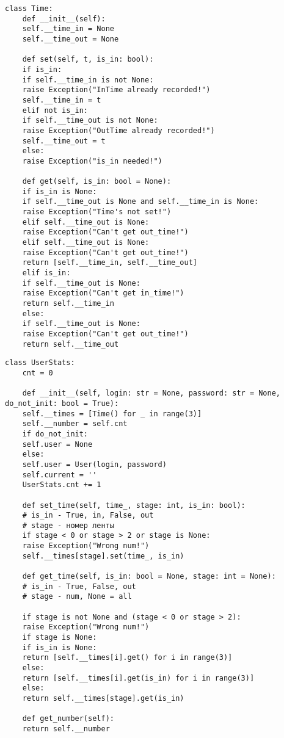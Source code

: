 \documentclass[../report.tex]{subfiles}
\begin{document}
\newpage
\begin{lstlisting}[caption=Класс Time]
	class Time:
	def __init__(self):
	self.__time_in = None
	self.__time_out = None
	
	def set(self, t, is_in: bool):
	if is_in:
	if self.__time_in is not None:
	raise Exception("InTime already recorded!")
	self.__time_in = t
	elif not is_in:
	if self.__time_out is not None:
	raise Exception("OutTime already recorded!")
	self.__time_out = t
	else:
	raise Exception("is_in needed!")
	
	def get(self, is_in: bool = None):
	if is_in is None:
	if self.__time_out is None and self.__time_in is None:
	raise Exception("Time's not set!")
	elif self.__time_out is None:
	raise Exception("Can't get out_time!")
	elif self.__time_out is None:
	raise Exception("Can't get out_time!")
	return [self.__time_in, self.__time_out]
	elif is_in:
	if self.__time_out is None:
	raise Exception("Can't get in_time!")
	return self.__time_in
	else:
	if self.__time_out is None:
	raise Exception("Can't get out_time!")
	return self.__time_out
\end{lstlisting}

\newpage
\begin{lstlisting}[caption=Класс UserStats]
	class UserStats:
	cnt = 0
	
	def __init__(self, login: str = None, password: str = None, 	do_not_init: bool = True):
	self.__times = [Time() for _ in range(3)]
	self.__number = self.cnt
	if do_not_init:
	self.user = None
	else:
	self.user = User(login, password)
	self.current = ''
	UserStats.cnt += 1
	
	def set_time(self, time_, stage: int, is_in: bool):
	# is_in - True, in, False, out
	# stage - номер ленты
	if stage < 0 or stage > 2 or stage is None:
	raise Exception("Wrong num!")
	self.__times[stage].set(time_, is_in)
	
	def get_time(self, is_in: bool = None, stage: int = None):
	# is_in - True, False, out
	# stage - num, None = all
	
	if stage is not None and (stage < 0 or stage > 2):
	raise Exception("Wrong num!")
	if stage is None:
	if is_in is None:
	return [self.__times[i].get() for i in range(3)]
	else:
	return [self.__times[i].get(is_in) for i in range(3)]
	else:
	return self.__times[stage].get(is_in)
	
	def get_number(self):
	return self.__number
\end{lstlisting}
\end{document}
